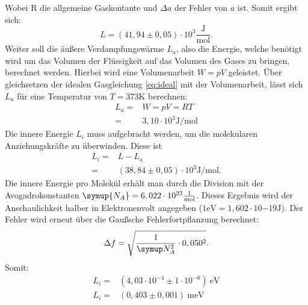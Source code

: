 Wobei R die allgemeine Gaskontante und $\Delta a$ der Fehler von $a$ ist.
Somit ergibt sich:
\begin{equation*}
  L=(41,94 \pm 0,05)\cdot 10^3 \frac{\si{\joule}}{\si{\mol}}.
\end{equation*}
Weiter soll die äußere Verdampfungswärme $L_a$, also die Energie, welche
benötigt wird um das Volumen der Flüssigkeit auf das Volumen des Gases
zu bringen, berechnet werden. Hierbei wird eine Volumenarbeit $W=pV$ geleistet.
Über gleichsetzen der idealen Gasgleichung \eqref{eq:ideal} mit der
Volumenarbeit, lässt sich $L_a$ für eine Temperatur von $T=373 \si{\kelvin}$
berechnen:
\begin{align*}
  L_a =& W =pV=RT \\
      =& 3,10 \cdot 10^3 \si{\joule \per \mol}
\end{align*}
Die innere Energie $L_i$ muss aufgebracht werden, um die molekularen
Anziehungskräfte zu überwinden. Diese ist
\begin{align*}
  L_i=&L-L_a \\
  =& (38,84 \pm 0,05)\cdot 10^3 \si{\joule\per\mol}.
\end{align*}
 Die innere Energie pro Molekül erhält man durch die Division mit der Avogadrokonstanten
 $\symup{N_A}=6,022 \cdot 10^{23} \frac{1}{\si{\mol}}$.
 Dieses Ergebnis wird der Anschaulichkeit halber in Elektronenvolt angegeben
 ($1\si{\electronvolt}=1,602\cdot 10{{-19}}\si{\joule})$.
 Der Fehler wird erneut über die Gaußsche Fehlerfortpflanzung berechnet:
 \begin{equation*}
   \Delta f=\sqrt{\frac{1}{\symup N_A^2}\cdot 0,050^2}.
 \end{equation*}
 Somit:
 \begin{align*}
   L_i =&(4,03\cdot 10^{-4} \pm 1\cdot 10^{-6})\ \si{\electronvolt} \\
   L_i =&(0,403 \pm 0,001) \ \si{\milli\electronvolt}
 \end{align*}

